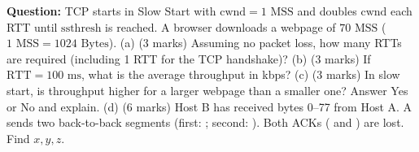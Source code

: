 
\textbf{Question:} TCP starts in Slow Start with $\mathrm{cwnd}=1\text{ MSS}$ and doubles $\mathrm{cwnd}$ each RTT until $\mathrm{ssthresh}$ is reached. A browser downloads a webpage of $70\text{ MSS}$ ($1\text{ MSS} = 1024\text{ Bytes}$).
(a) (3 marks) Assuming no packet loss, how many RTTs are required (including 1 RTT for the TCP handshake)?
(b) (3 marks) If $\mathrm{RTT}=100\text{ ms}$, what is the average throughput in kbps?
(c) (3 marks) In slow start, is throughput higher for a larger webpage than a smaller one? Answer Yes or No and explain.
(d) (6 marks) Host B has received bytes 0–77 from Host A. A sends two back-to-back segments (first: ; second: ). Both ACKs ( and ) are lost. Find $x, y, z$.


